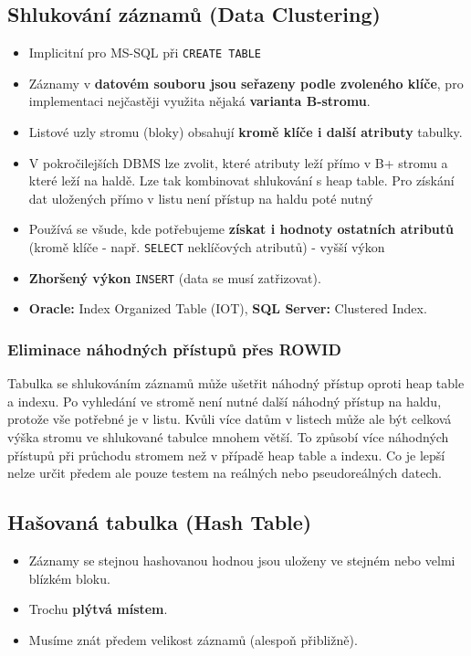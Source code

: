 \subsection{Shlukování záznamů (Data Clustering)}
\begin{itemize}
  \item Implicitní pro MS-SQL při \texttt{CREATE TABLE}
  \item Záznamy v \textbf{datovém souboru jsou seřazeny podle zvoleného klíče}, pro implementaci nejčastěji využita nějaká \textbf{varianta B-stromu}.
  \item Listové uzly stromu (bloky) obsahují \textbf{kromě klíče i další atributy} tabulky.
  \item V pokročilejších DBMS lze zvolit, které atributy leží přímo v B+ stromu a které leží na haldě. Lze tak kombinovat shlukování s heap table. Pro získání dat uložených přímo v listu není přístup na haldu poté nutný
  \item Používá se všude, kde potřebujeme \textbf{získat i hodnoty ostatních atributů} (kromě klíče - např. \texttt{SELECT} neklíčových atributů) - vyšší výkon
  \item \textbf{Zhoršený výkon} \texttt{INSERT} (data se musí zatřizovat).
  \item \textbf{Oracle:} Index Organized Table (IOT), \textbf{SQL Server:} Clustered Index.
\end{itemize}

\subsubsection{Eliminace náhodných přístupů přes ROWID} Tabulka se shlukováním záznamů může ušetřit náhodný přístup oproti heap table a indexu. Po vyhledání ve stromě není nutné další náhodný přístup na haldu, protože vše potřebné je v listu. Kvůli více datům v listech může ale být celková výška stromu ve shlukované tabulce mnohem větší. To způsobí více náhodných přístupů při průchodu stromem než  v případě heap table a indexu. Co je lepší nelze určit předem ale pouze testem na reálných nebo pseudoreálných datech.

\subsection{Hašovaná tabulka (Hash Table)}
\begin{itemize}
  \item Záznamy se stejnou hashovanou hodnou jsou uloženy ve stejném nebo velmi blízkém bloku.
  \item Trochu \textbf{plýtvá místem}.
  \item Musíme znát předem velikost záznamů (alespoň přibližně).
\end{itemize}

